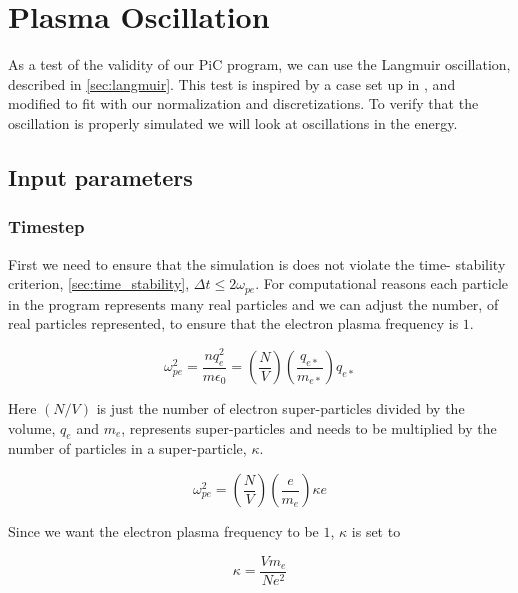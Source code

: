 \section{Plasma Oscillation}
	\label{sec:langmuir_verification}
	As a test of the validity of our PiC program, we can use the Langmuir
	oscillation, described in \cref{sec:langmuir}.
	This test is inspired by a case set up in \citet{birdsall_plasma_2004},
	and modified to fit with our normalization and discretizations.
	To verify that the oscillation is properly simulated we will look at oscillations in the energy.


    \subsection{Input parameters}
        \subsubsection{Timestep}
        First we need to ensure that the simulation is does not violate the time-
        stability criterion, \cref{sec:time_stability}, \(\Delta t \leq 2\omega_{pe}\).
        For computational reasons each particle in the program represents many real particles
        and we can adjust the number, of real particles represented, to ensure
        that the electron plasma frequency is \(1\).

        \begin{equation}
            \omega_{pe}^2 = \frac{nq^2_e}{m\epsilon_0} = \left(\frac{N}{V}\right)\left(\frac{q_{e*}}{m_{e*} }\right)q_{e*}
        \end{equation}

        Here \((N/V)\) is just the number of electron super-particles divided by the volume,
        \(q_e\) and \(m_e\), represents super-particles and needs to be multiplied by the number
        of particles in a super-particle, \(\kappa\).

        \begin{equation}
            \omega_{pe}^2 = \left(\frac{N}{V}\right)\left(\frac{e}{m_e}\right)\kappa e
        \end{equation}

        Since we want the electron plasma frequency to be \(1\), \(\kappa\) is set to

        \begin{equation}
            \kappa = \frac{Vm_e}{Ne^2}
        \end{equation}

